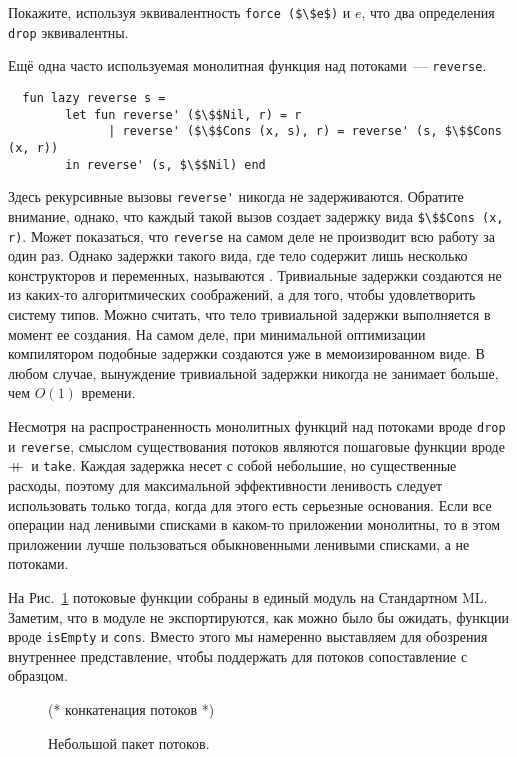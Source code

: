 \begin{exercise}\label{ex:4.1}
  Покажите, используя эквивалентность \lstinline!force ($\$e$)! и $e$,
  что два определения \lstinline!drop! эквивалентны. 
\end{exercise}

Ещё одна часто используемая монолитная функция над потоками~---
\lstinline!reverse!.
\begin{lstlisting}
  fun lazy reverse s =
        let fun reverse' ($\$$Nil, r) = r
              | reverse' ($\$$Cons (x, s), r) = reverse' (s, $\$$Cons (x, r))
        in reverse' (s, $\$$Nil) end
\end{lstlisting}
Здесь рекурсивные вызовы \lstinline!reverse'! никогда не
задерживаются. Обратите внимание, однако, что каждый такой вызов
создает задержку вида \lstinline!$\$$Cons (x, r)!. Может показаться,
что \lstinline!reverse! на самом деле не производит всю работу за один
раз. Однако задержки такого вида, где тело содержит лишь
несколько конструкторов и переменных, называются
. Тривиальные задержки создаются не из
каких-то алгоритмических соображений, а для того, чтобы удовлетворить
систему типов. Можно считать, что тело тривиальной задержки
выполняется в момент ее создания.  На самом деле, при минимальной
оптимизации компилятором подобные задержки создаются уже в
мемоизированном виде. В любом случае, вынуждение тривиальной
задержки никогда не занимает больше, чем $O(1)$ времени.

Несмотря на распространенность монолитных функций над потоками вроде
\lstinline!drop! и \lstinline!reverse!, смыслом существования потоков
являются пошаговые функции вроде $+\!\!\!+\,$ и \lstinline!take!. Каждая
задержка несет с собой небольшие, но существенные расходы, поэтому для
максимальной эффективности ленивость следует использовать только тогда,
когда для этого есть серьезные основания. Если все операции над
ленивыми списками в каком-то приложении монолитны, то в этом
приложении лучше пользоваться обыкновенными ленивыми списками, а не
потоками.

На Рис.~\ref{fig:4.1} потоковые функции собраны в единый модуль на
Стандартном ML. Заметим, что в модуле не экспортируются, как можно
было бы ожидать,  функции вроде \lstinline!isEmpty! и
\lstinline!cons!. Вместо этого мы намеренно выставляем для обозрения
внутреннее представление, чтобы поддержать для потоков сопоставление с
образцом. 

\begin{figure}
  \centering
  
  (* конкатенация потоков *)
  
  \caption{Небольшой пакет потоков.}
  \label{fig:4.1}
\end{figure}

